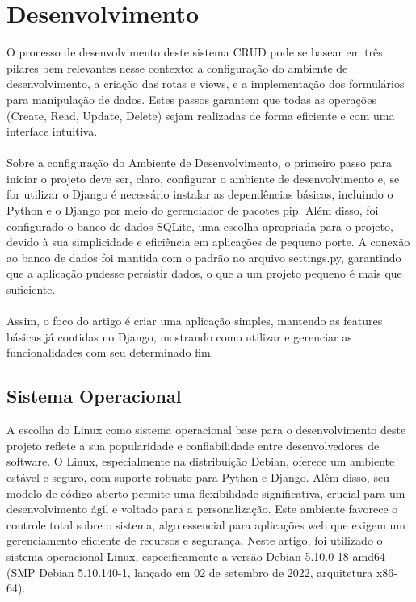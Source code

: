 \documentclass[11pt]{article} %
\begin{document}
\maketitle
\section{Desenvolvimento}
O processo de desenvolvimento deste sistema CRUD pode se basear em três pilares bem relevantes nesse contexto: a configuração do ambiente de desenvolvimento, a criação das rotas e views, e a implementação dos formulários para manipulação de dados. Estes passos garantem que todas as operações (Create, Read, Update, Delete) sejam realizadas de forma eficiente e com uma interface intuitiva. \\\\
Sobre a configuração do Ambiente de Desenvolvimento, o primeiro passo para iniciar o projeto deve ser, claro, configurar o ambiente de desenvolvimento e, se for utilizar o Django é necessário instalar as dependências básicas, incluindo o Python e o Django por meio do gerenciador de pacotes pip. Além disso, foi configurado o banco de dados SQLite, uma escolha apropriada para o projeto, devido à sua simplicidade e eficiência em aplicações de pequeno porte. A conexão ao banco de dados foi mantida com o padrão no arquivo settings.py, garantindo que a aplicação pudesse persistir dados, o que a um projeto pequeno é mais que suficiente. \\\\
Assim, o foco do artigo é criar uma aplicação simples, mantendo as features básicas já contidas no Django, mostrando como utilizar e gerenciar as funcionalidades com seu determinado fim.
\subsection{Sistema Operacional}
A escolha do Linux como sistema operacional base para o desenvolvimento deste projeto reflete a sua popularidade e confiabilidade entre desenvolvedores de software. O Linux, especialmente na distribuição Debian, oferece um ambiente estável e seguro, com suporte robusto para Python e Django. Além disso, seu modelo de código aberto permite uma flexibilidade significativa, crucial para um desenvolvimento ágil e voltado para a personalização. Este ambiente favorece o controle total sobre o sistema, algo essencial para aplicações web que exigem um gerenciamento eficiente de recursos e segurança. Neste artigo, foi utilizado o sistema operacional Linux, especificamente a versão Debian 5.10.0-18-amd64 (SMP Debian 5.10.140-1, lançado em 02 de setembro de 2022, arquitetura x86-64).
\end{document}
